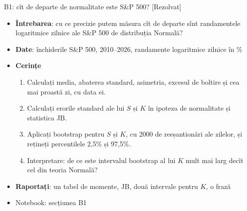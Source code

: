 \begin{frame}{B1: cît de departe de normalitate este S\&P 500? [Rezolvat]}
\itemsize{\footnotesize}
\begin{itemize}
\item \textbf{Întrebarea}: cu ce precizie putem măsura cît de departe sînt randamentele logaritmice zilnice ale S\&P 500 de distribuția Normală?
\item \textbf{Date}: închiderile S\&P 500, 2010--2026, randamente logaritmice zilnice în \%
\item \textbf{Cerințe}
\begin{enumerate}
    \item Calculați media, abaterea standard, asimetria, excesul de boltire și cea mai proastă zi, cu data ei.
    \item Calculați erorile standard ale lui $S$ și $K$ în ipoteza de normalitate și statistica JB.
    \item Aplicați bootstrap pentru $S$ și $K$, cu 2000 de reeșantionări ale zilelor, și rețineți percentilele 2,5\% și 97,5\%.
    \item Interpretare: de ce este intervalul bootstrap al lui $K$ mult mai larg decît cel din teoria Normală?
\end{enumerate}
\item \textbf{Raportați}: un tabel de momente, JB, două intervale pentru $K$, o frază
\item Notebook: secțiunea B1
\end{itemize}
\end{frame}

